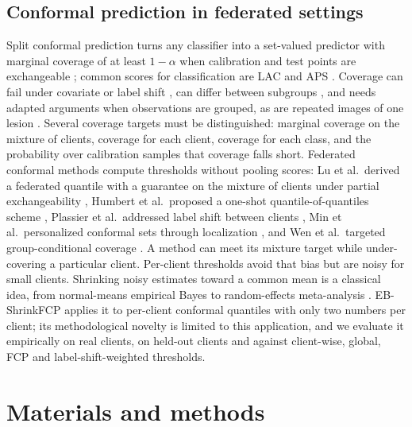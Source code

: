 \documentclass[VANCOUVER,Times1COL]{WileyNJDv5}
\begin{document}
\subsection{Conformal prediction in federated settings}

Split conformal prediction turns any classifier into a set-valued predictor with marginal coverage of at
least $1-\alpha$ when calibration and test points are exchangeable
\cite{vovk2005algorithmic,angelopoulos2023gentle}; common scores for classification
are LAC \cite{sadinle2019lac} and APS \cite{romano2020aps}. Coverage can fail under
covariate or label shift \cite{tibshirani2019covariate,podkopaev2021labelshift,barber2023beyond}, can
differ between subgroups \cite{lu2022fair}, and needs adapted arguments when observations are grouped,
as are repeated images of one lesion \cite{dunn2022hierarchical,lee2023hierarchical}. Several coverage
targets must be distinguished: marginal coverage on the mixture of clients, coverage for each client,
coverage for each class, and the probability over calibration samples that coverage falls short.
Federated conformal methods compute thresholds without pooling scores: Lu et al.\ derived a federated
quantile with a guarantee on the mixture of clients under partial exchangeability
\cite{lu2023fcp}, Humbert et al.\ proposed a one-shot quantile-of-quantiles scheme
\cite{humbert2023oneshot}, Plassier et al.\ addressed label shift between clients
\cite{plassier2023labelshift}, Min et al.\ personalized conformal sets through localization
\cite{min2025pfcp}, and Wen et al.\ targeted group-conditional coverage \cite{wen2026gcfcp}. A method can
meet its mixture target while under-covering a particular client. Per-client thresholds avoid that bias
but are noisy for small clients. Shrinking noisy estimates toward a common mean is a classical idea,
from normal-means empirical Bayes \cite{efron1975stein} to random-effects meta-analysis
\cite{dersimonian1986meta}. EB-ShrinkFCP applies it to per-client conformal quantiles with only two
numbers per client; its methodological novelty is limited to this application, and we evaluate it
empirically on real clients, on held-out clients and against client-wise, global, FCP and
label-shift-weighted thresholds.

\section{Materials and methods}
\label{sec:methods}
\end{document}
